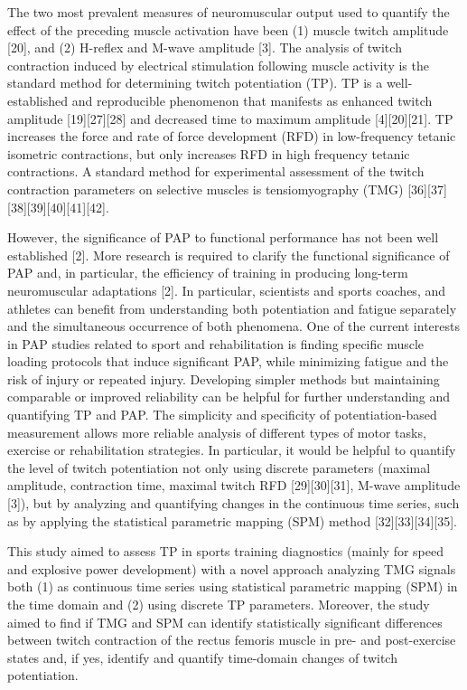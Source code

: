 \documentclass[utf8]{style/FrontiersinHarvard}
\begin{document}
The two most prevalent measures of neuromuscular output used to quantify the effect of the preceding muscle activation have been (1) muscle twitch amplitude [20], and (2) H-reflex and M-wave amplitude [3].
The analysis of twitch contraction induced by electrical stimulation following muscle activity is the standard method for determining twitch potentiation (TP).
TP is a well-established and reproducible phenomenon that manifests as enhanced twitch amplitude [19][27][28] and decreased time to maximum amplitude [4][20][21].  %
TP increases the force and rate of force development (RFD) in low-frequency tetanic isometric contractions, but only increases RFD in high frequency tetanic contractions.
A standard method for experimental assessment of the twitch contraction parameters on selective muscles is tensiomyography (TMG) [36][37][38][39][40][41][42].

However, the significance of PAP to functional performance has not been well established [2].
More research is required to clarify the functional significance of PAP and, in particular, the efficiency of training in producing long-term neuromuscular adaptations [2].
In particular, scientists and sports coaches, and athletes can benefit from understanding both potentiation and fatigue separately and the simultaneous occurrence of both phenomena.
One of the current interests in PAP studies related to sport and rehabilitation is finding specific muscle loading protocols that induce significant PAP, while minimizing fatigue and the risk of injury or repeated injury.
Developing simpler methods but maintaining comparable or improved reliability can be helpful for further understanding and quantifying TP and PAP.
The simplicity and specificity of potentiation-based measurement allows more reliable analysis of different types of motor tasks, exercise or rehabilitation strategies.
In particular, it would be helpful to quantify the level of twitch potentiation not only using discrete parameters (maximal amplitude, contraction time, maximal twitch RFD [29][30][31], M-wave amplitude [3]), but by analyzing and quantifying changes in the continuous time series, such as by applying the statistical parametric mapping (SPM) method [32][33][34][35].

This study aimed to assess TP in sports training diagnostics (mainly for speed and explosive power development) with a novel approach analyzing TMG signals both (1) as continuous time series using statistical parametric mapping (SPM) in the time domain and (2) using discrete TP parameters. 
Moreover, the study aimed to find if TMG and SPM can identify statistically significant differences between twitch contraction of the rectus femoris muscle in pre- and post-exercise states and, if yes, identify and quantify time-domain changes of twitch potentiation.
\end{document}

